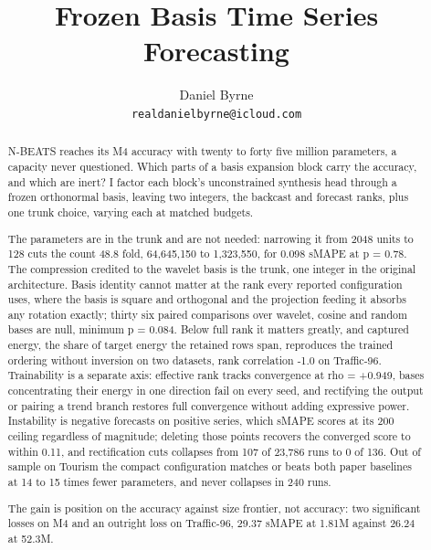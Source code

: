 \title{Frozen Basis Time Series Forecasting}

\author{%
  Daniel Byrne\\
  \texttt{realdanielbyrne@icloud.com}
}

\maketitle

\begin{abstract}
N-BEATS reaches its M4 accuracy with twenty to forty five million parameters, a capacity never
questioned. Which parts of a basis expansion block carry the accuracy, and which are inert? I
factor each block's unconstrained synthesis head through a frozen orthonormal basis, leaving two
integers, the backcast and forecast ranks, plus one trunk choice, varying each at matched
budgets.

The parameters are in the trunk and are not needed: narrowing it from 2048 units to 128 cuts the
count 48.8 fold, 64,645,150 to 1,323,550, for 0.098 sMAPE at p = 0.78. The compression credited
to the wavelet basis is the trunk, one integer in the original architecture. Basis identity
cannot matter at the rank every reported configuration uses, where the basis is square and
orthogonal and the projection feeding it absorbs any rotation exactly; thirty six paired
comparisons over wavelet, cosine and random bases are null, minimum p = 0.084. Below full rank
it matters greatly, and captured energy, the share of target energy the retained rows span,
reproduces the trained ordering without inversion on two datasets, rank correlation -1.0 on
Traffic-96. Trainability is a separate axis: effective rank tracks convergence at rho = +0.949,
bases concentrating their energy in one direction fail on every seed, and rectifying the output
or pairing a trend branch restores full convergence without adding expressive power. Instability
is negative forecasts on positive series, which sMAPE scores at its 200 ceiling regardless of
magnitude; deleting those points recovers the converged score to within 0.11, and rectification
cuts collapses from 107 of 23,786 runs to 0 of 136. Out of sample on Tourism the compact
configuration matches or beats both paper baselines at 14 to 15 times fewer parameters, and
never collapses in 240 runs.

The gain is position on the accuracy against size frontier, not accuracy: two significant losses
on M4 and an outright loss on Traffic-96, 29.37 sMAPE at 1.81M against 26.24 at 52.3M.
\end{abstract}

